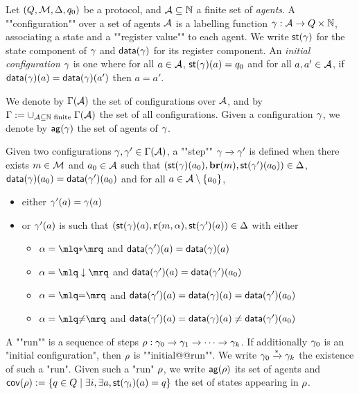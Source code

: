 \begin{definition}
	Let $(Q,\mathcal{M}, \Delta, q_0)$ be a protocol, and $\mathcal{A} \subseteq \mathbb{N}$ a finite set of \emph{agents}.
	A ""configuration"" over a set of agents $\mathcal{A}$ is a labelling function $\gamma : \mathcal{A} \to Q \times \mathbb{N}$, associating a state and a ""register value"" to each agent. We write $\mathsf{st}(\gamma)$ for the state component of $\gamma$ and $\mathsf{data}(\gamma)$ for its register component. 
	An \emph{initial configuration} $\gamma$ is one where for all $a \in \mathcal{A}$, $\mathsf{st}(\gamma)(a) = q_0$ and for all $a, a' \in \mathcal{A}$, if $\mathsf{data}(\gamma)(a) = \mathsf{data}(\gamma)(a')$ then $a=a'$.
	
	\AP We denote by $\Gamma(\mathcal{A})$ the set of configurations over $\mathcal{A}$, and by $\Gamma := \cup_{\mathcal{A} \subseteq \mathbb{N} \text{ finite }} \Gamma(\mathcal{A})$ the set of all configurations. Given a configuration $\gamma$, we denote by $\mathsf{ag}(\gamma)$ the set of agents of $\gamma$.

	\AP Given two configurations $\gamma, \gamma' \in \Gamma(\mathcal{A})$, a ""step"" $\gamma \xrightarrow{} \gamma'$ is defined when there exists $m \in \mathcal{M}$ and $a_0 \in \mathcal{A}$ such that $(\mathsf{st}(\gamma)(a_0),\textbf{br}(m), \mathsf{st}(\gamma')(a_0)) \in \Delta$, $\mathsf{data}(\gamma)(a_0) = \mathsf{data}(\gamma')(a_0)$ and for all $a \in \mathcal{A}\setminus \{a_0\}$,  
	\begin{itemize}
		\item either $\gamma'(a) = \gamma(a)$
		
		\item or $\gamma'(a)$ is such that $(\mathsf{st}(\gamma)(a), \textbf{r}(m, \alpha), \mathsf{st}(\gamma')(a)) \in \Delta$ with either
		\begin{itemize}
			\item $\anact = \quotemarks{\dummyact}$ 
			and $\mathsf{data}(\gamma')(a) = \mathsf{data}(\gamma)(a)$
			\item $\anact = \quotemarks{\enregact}$ and $\mathsf{data}(\gamma')(a) = \mathsf{data}(\gamma')(a_0)$
			\item $\anact = \quotemarks{\eqtestact}$ and $\mathsf{data}(\gamma')(a) = \mathsf{data}(\gamma)(a) =\mathsf{data}(\gamma')(a_0)$
			\item $\anact = \quotemarks{\diseqtestact}$ and $\mathsf{data}(\gamma')(a) = \mathsf{data}(\gamma)(a) \ne \mathsf{data}(\gamma')(a_0)$
		\end{itemize}
	\end{itemize}

	\AP A ""run"" is a sequence of steps $\rho : \gamma_0 \xrightarrow{} \gamma_1 \xrightarrow{} \cdots \xrightarrow{} \gamma_k$. If additionally $\gamma_0$ is an "initial configuration", then $\rho$ is ""initial@@run"". We write $\gamma_0 \xrightarrow{*} \gamma_k$ the existence of such a "run". Given such a "run" $\rho$, we write $\mathsf{ag}(\rho)$ its set of agents and $\mathsf{cov}(\rho):= \{q \in Q \mid \exists i, \exists a, \mathsf{st}(\gamma_i)(a) = q\}$ the set of states appearing in $\rho$.  

\end{definition}

